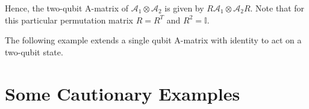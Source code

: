 \documentclass[12pt]{iopart}
\begin{document}
Hence, the two-qubit A-matrix of $\mathcal{A}_1 \otimes \mathcal{A}_2$ is given by $R \mathcal{A}_1 \otimes \mathcal{A}_2 R$. Note that for this particular permutation matrix $R = R^T$ and $R^2 = \mathbb{I}$.

The following example extends a single qubit A-matrix with identity to act on a two-qubit state.

\section{Some Cautionary Examples}
\label{Sec:extendingA-matrix_example}
\end{document}
